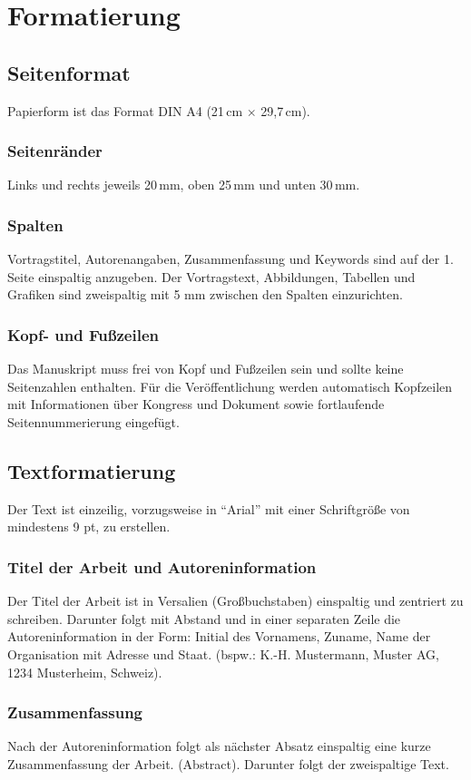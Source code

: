 \documentclass[german,10pt]{DLRK_v1.11}
\begin{document}
\section{Formatierung}
\subsection{Seitenformat}
Papierform ist das Format DIN A4 (21\,cm $\times$ 29,7\,cm).
\subsubsection{Seitenränder}
Links und rechts jeweils 20\,mm, oben 25\,mm und unten 30\,mm.
\subsubsection{Spalten}
Vortragstitel, Autorenangaben, Zusammenfassung und Keywords sind auf der 1. Seite einspaltig anzugeben. Der Vortragstext, Abbildungen, Tabellen und Grafiken sind zweispaltig mit 5 mm zwischen den Spalten einzurichten.
\subsubsection{Kopf- und Fußzeilen}
Das Manuskript muss frei von Kopf und Fußzeilen sein und sollte keine Seitenzahlen enthalten. Für die Veröffentlichung werden automatisch Kopfzeilen mit
Informationen über Kongress und Dokument sowie
fortlaufende Seitennummerierung eingefügt.

\subsection{Textformatierung}
Der Text ist einzeilig, vorzugsweise in \enquote{Arial} mit einer Schriftgröße von mindestens 9 pt, zu erstellen.

\subsubsection{Titel der Arbeit und Autoreninformation}
Der Titel der Arbeit ist in Versalien (Großbuchstaben) einspaltig und zentriert zu schreiben. Darunter folgt mit Abstand und in einer separaten Zeile die Autoreninformation in der Form: Initial des Vornamens, Zuname, Name der Organisation mit Adresse und Staat. (bspw.: K.-H. Mustermann, Muster AG, 1234 Musterheim, Schweiz).

\subsubsection{Zusammenfassung}
Nach der Autoreninformation folgt als nächster Absatz einspaltig eine kurze Zusammenfassung der Arbeit. (Abstract). Darunter folgt der zweispaltige Text.
\end{document}
